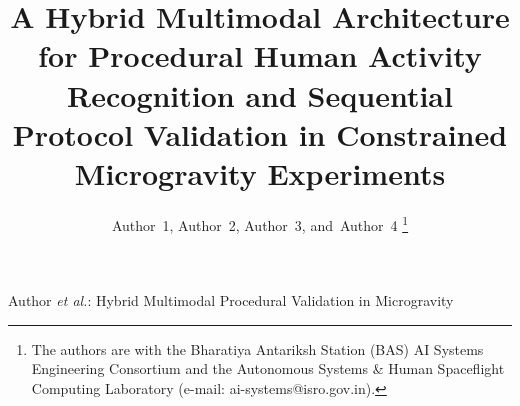 \documentclass[journal,twocolumn]{IEEEtran}
\begin{document}
\title{A Hybrid Multimodal Architecture for Procedural Human Activity Recognition and Sequential Protocol Validation in Constrained Microgravity Experiments}

\author{Author~1,
        Author~2,
        Author~3,
        and~Author~4%
\thanks{The authors are with the Bharatiya Antariksh Station (BAS) AI Systems Engineering Consortium and the Autonomous Systems \& Human Spaceflight Computing Laboratory (e-mail: ai-systems@isro.gov.in).}}

%
{Author \MakeLowercase{\textit{et al.}}: Hybrid Multimodal Procedural Validation in Microgravity}

\maketitle
\end{document}
